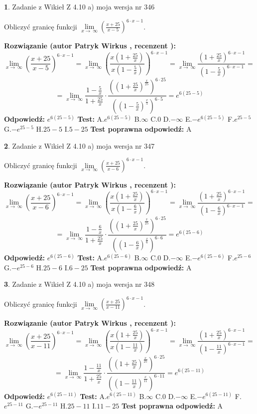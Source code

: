 \documentclass[12pt, a4paper]{article}
\theoremstyle{definition} %
\newtheorem{zad}{}
\newcommand{\zadStart}[1]{\begin{zad}#1\newline}
\newcommand{\zadStop}{\end{zad}}
\newcommand{\rozwStart}[2]{\noindent \textbf{Rozwiązanie (autor #1 , recenzent #2): }\newline}
\newcommand{\rozwStop}{\newline}
\newcommand{\odpStart}{\noindent \textbf{Odpowiedź:}\newline}
\newcommand{\odpStop}{\newline}
\newcommand{\testStart}{\noindent \textbf{Test:}\newline}
\newcommand{\testStop}{\newline}
\newcommand{\kluczStart}{\noindent \textbf{Test poprawna odpowiedź:}\newline}
\newcommand{\kluczStop}{\newline}
\begin{document}
\zadStart{Zadanie z Wikieł Z 4.10 a) moja wersja nr 346}


Obliczyć granicę funkcji  $\lim\limits_{x\to\ \infty}(\frac{x+25}{x-5})^{6\cdot x-1}$.
\zadStop
\rozwStart{Patryk Wirkus}{}
$$\lim\limits_{x\to\ \infty}(\frac{x+25}{x-5})^{6\cdot x-1} = \lim\limits_{x\to\ \infty}(\frac{x(1+\frac{25}{x})}{x(1-\frac{5}{x})})^{6\cdot x-1}=\lim\limits_{x\to\ \infty}\frac{(1+\frac{25}{x})^{6\cdot x-1}}{(1-\frac{5}{x})^{6\cdot x-1}}=$$
$$=\lim\limits_{x\to\ \infty}\frac{1-\frac{5}{x}}{1+\frac{25}{x}}\cdot\frac{((1+\frac{25}{x})^{\frac{x}{25}})^{6\cdot25}}{((1-\frac{5}{x})^{\frac{x}{5}})^{6\cdot5}}=e^{6(25-5)}$$
\rozwStop
\odpStart
$e^{6(25-5)}$
\odpStop
\testStart
A.$e^{6(25-5)}$ B.$\infty$ C.$0$ D.$-\infty$ E.$-e^{6(25-5)}$
F.$e^{25-5}$ G.$-e^{25-5}$
H.$25-5$
I.$5-25$
\testStop
\kluczStart
A
\kluczStop



\zadStart{Zadanie z Wikieł Z 4.10 a) moja wersja nr 347}


Obliczyć granicę funkcji  $\lim\limits_{x\to\ \infty}(\frac{x+25}{x-6})^{6\cdot x-1}$.
\zadStop
\rozwStart{Patryk Wirkus}{}
$$\lim\limits_{x\to\ \infty}(\frac{x+25}{x-6})^{6\cdot x-1} = \lim\limits_{x\to\ \infty}(\frac{x(1+\frac{25}{x})}{x(1-\frac{6}{x})})^{6\cdot x-1}=\lim\limits_{x\to\ \infty}\frac{(1+\frac{25}{x})^{6\cdot x-1}}{(1-\frac{6}{x})^{6\cdot x-1}}=$$
$$=\lim\limits_{x\to\ \infty}\frac{1-\frac{6}{x}}{1+\frac{25}{x}}\cdot\frac{((1+\frac{25}{x})^{\frac{x}{25}})^{6\cdot25}}{((1-\frac{6}{x})^{\frac{x}{6}})^{6\cdot6}}=e^{6(25-6)}$$
\rozwStop
\odpStart
$e^{6(25-6)}$
\odpStop
\testStart
A.$e^{6(25-6)}$ B.$\infty$ C.$0$ D.$-\infty$ E.$-e^{6(25-6)}$
F.$e^{25-6}$ G.$-e^{25-6}$
H.$25-6$
I.$6-25$
\testStop
\kluczStart
A
\kluczStop



\zadStart{Zadanie z Wikieł Z 4.10 a) moja wersja nr 348}


Obliczyć granicę funkcji  $\lim\limits_{x\to\ \infty}(\frac{x+25}{x-11})^{6\cdot x-1}$.
\zadStop
\rozwStart{Patryk Wirkus}{}
$$\lim\limits_{x\to\ \infty}(\frac{x+25}{x-11})^{6\cdot x-1} = \lim\limits_{x\to\ \infty}(\frac{x(1+\frac{25}{x})}{x(1-\frac{11}{x})})^{6\cdot x-1}=\lim\limits_{x\to\ \infty}\frac{(1+\frac{25}{x})^{6\cdot x-1}}{(1-\frac{11}{x})^{6\cdot x-1}}=$$
$$=\lim\limits_{x\to\ \infty}\frac{1-\frac{11}{x}}{1+\frac{25}{x}}\cdot\frac{((1+\frac{25}{x})^{\frac{x}{25}})^{6\cdot25}}{((1-\frac{11}{x})^{\frac{x}{11}})^{6\cdot11}}=e^{6(25-11)}$$
\rozwStop
\odpStart
$e^{6(25-11)}$
\odpStop
\testStart
A.$e^{6(25-11)}$ B.$\infty$ C.$0$ D.$-\infty$ E.$-e^{6(25-11)}$
F.$e^{25-11}$ G.$-e^{25-11}$
H.$25-11$
I.$11-25$
\testStop
\kluczStart
A
\kluczStop
\end{document}
